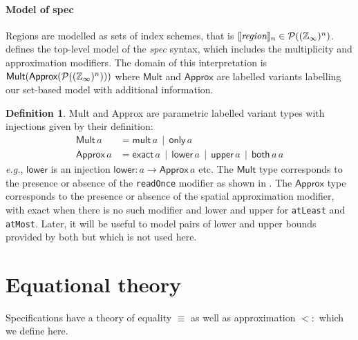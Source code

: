 \documentclass[10pt,preprint]{sigplanconf}
\newcounter{block}
\theoremstyle{definition}
\newtheorem{definition}[block]{Definition}
\newcommand{\eg}{\emph{e.g.}}
\newcommand{\interp}[1]{\llbracket{#1}\rrbracket}
\newcommand{\term}[1]{\texttt{#1}}
\begin{document}
\paragraph{Model of spec}

Regions are modelled as sets of index
schemes, that is
$\interp{\textit{region}}_n \in \mathcal{P}((\domainVal{})^n)$.
 defines the top-level model of the
\textit{spec} syntax, which includes the multiplicity and
approximation modifiers. The domain of this interpretation
is $\textsf{Mult}(\textsf{Approx}(\mathcal{P}((\mathbb{Z}_\infty{})^n)))$
where $\textsf{Mult}$ and $\textsf{Approx}$ are labelled variants
labelling our set-based model with additional information.

\begin{definition} \textsf{Mult}
and \textsf{Approx} are parametric labelled variant types
with injections given by their definition:
%
\begin{align*}
\textsf{Mult} \, a & = \textsf{mult} \, a \,\mid\, \textsf{only} \, a \\
\textsf{Approx} \, a & = \textsf{exact} \, a \,\mid\, \textsf{lower} \, a \,\mid\,
\textsf{upper} \, a \,\mid\, \textsf{both} \, a \, a
\end{align*}
\eg{}, $\mathsf{lower}$ is an injection
$\mathsf{lower} : a \rightarrow \mathsf{Approx} \, a$ etc. The
$\textsf{Mult}$ type corresponds to the presence or absence of the
\term{readOnce} modifier as shown in .
The $\textsf{Approx}$ type corresponds to the presence or absence of
the spatial approximation modifier, with \textsf{exact} when there is
no such modifier and \textsf{lower} and \textsf{upper} for
\term{atLeast} and \term{atMost}. Later, it will be useful to model
pairs of lower and upper bounds provided by \textsf{both} but which is
not used
here.%
\label{def:mult-and-approx}
\end{definition}

\section{Equational theory}
\label{sec:eqs}

Specifications have a theory of equality $\equiv$ as well
as approximation $<:$ which we define here.
\end{document}
